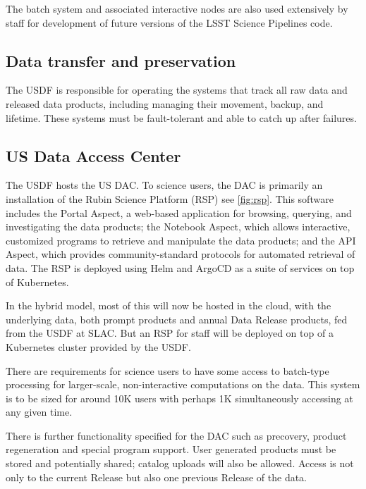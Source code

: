 The batch system and associated interactive nodes are also used extensively by staff for development of future versions of the LSST Science Pipelines code.\cite{2019ASPC..523..521B}

\subsection{Data transfer and preservation} \label{req:dbb}
The USDF is responsible for operating the systems that track all raw data and released data products, including managing their movement, backup, and lifetime.
These systems must be fault-tolerant and able to catch up after failures.

\subsection{US Data Access Center}
The USDF hosts the US DAC.
To science users, the DAC is primarily an installation of the Rubin Science Platform (RSP)\cite{LDM-542} see \autoref{fig:rsp}.
This software includes the Portal Aspect, a web-based application for browsing, querying, and investigating the data products; the Notebook Aspect, which allows interactive, customized programs to retrieve and manipulate the data products; and the API Aspect, which provides community-standard protocols for automated retrieval of data.
The RSP is deployed using Helm and ArgoCD as a suite of services on top of Kubernetes.

In the hybrid model, most of this will now be hosted in the cloud, with the underlying data, both prompt products and annual Data Release products, fed from the USDF at SLAC.
But an RSP for staff will be deployed on top of a Kubernetes cluster provided by the USDF.

There are requirements for science users to have some access to batch-type processing for larger-scale, non-interactive computations on the data.\cite{DMTN-223}
This system is to be sized for around 10K users with perhaps 1K simultaneously accessing at any given time.

There is further functionality specified for the DAC such as precovery, product regeneration and special program support.
User generated products must be stored and potentially shared; catalog uploads will also be allowed.
Access is not only to the current Release but also one previous Release of the data.
